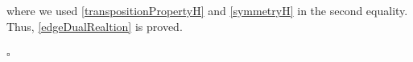 \documentclass[11pt]{article}
\numberwithin{equation}{section}
\numberwithin{equation}{subsection}
\begin{document}
 where we used \eqref{transpositionPropertyH} and \eqref{symmetryH} in the second equality. Thus, \eqref{edgeDualRealtion} is proved. 
 
 
 \begin{flushright}
     $\square$
 \end{flushright}
\end{document}
